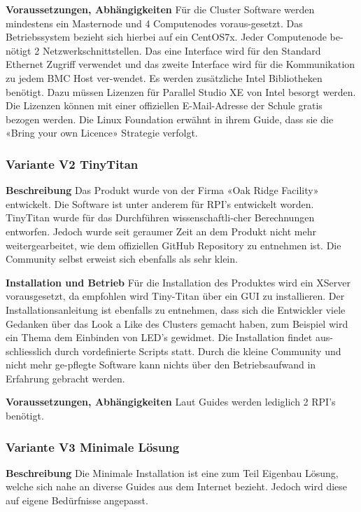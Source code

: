 \textbf{Voraussetzungen, Abhängigkeiten}\newline
Für die Cluster Software werden mindestens ein Masternode und 4 Computenodes voraus-gesetzt. Das Betriebssystem bezieht sich hierbei auf ein CentOS7x. Jeder Computenode be-nötigt 2 Netzwerkschnittstellen. Das eine Interface wird für den Standard Ethernet Zugriff verwendet und das zweite Interface wird für die Kommunikation zu jedem BMC Host ver-wendet. Es werden zusätzliche Intel Bibliotheken benötigt. Dazu müssen Lizenzen für Parallel Studio XE von Intel besorgt werden. Die Lizenzen können mit einer offiziellen E-Mail-Adresse der Schule gratis bezogen werden. Die Linux Foundation erwähnt in ihrem Guide, dass sie die «Bring your own Licence» Strategie verfolgt.

\subsubsection{Variante V2 \flqq TinyTitan\frqq}
\textbf{Beschreibung}\newline
Das Produkt wurde von der Firma «Oak Ridge Facility» entwickelt. Die Software ist unter anderem für RPI’s entwickelt worden. TinyTitan wurde für das Durchführen wissenschaftli-cher Berechnungen entworfen. Jedoch wurde seit geraumer Zeit an dem Produkt nicht mehr weitergearbeitet, wie dem offiziellen GitHub Repository zu entnehmen ist. Die Community selbst erweist sich ebenfalls als sehr klein. 

\textbf{Installation und Betrieb}\newline
Für die Installation des Produktes wird ein XServer vorausgesetzt, da empfohlen wird Tiny-Titan über ein GUI zu installieren. Der Installationsanleitung ist ebenfalls zu entnehmen, dass sich die Entwickler viele Gedanken über das Look a Like des Clusters gemacht haben, zum Beispiel wird ein Thema dem Einbinden von LED’s gewidmet. Die Installation findet aus-schliesslich durch vordefinierte Scripts statt. Durch die kleine Community und nicht mehr ge-pflegte Software kann nichts über den Betriebsaufwand in Erfahrung gebracht werden.

\textbf{Voraussetzungen, Abhängigkeiten}\newline
Laut Guides werden lediglich 2 RPI’s benötigt.

\subsubsection{Variante V3 \flqq Minimale Lösung\frqq}
\textbf{Beschreibung}\newline
Die Minimale Installation ist eine zum Teil Eigenbau Lösung, welche sich nahe an diverse Guides aus dem Internet bezieht. Jedoch wird diese auf eigene Bedürfnisse angepasst.

